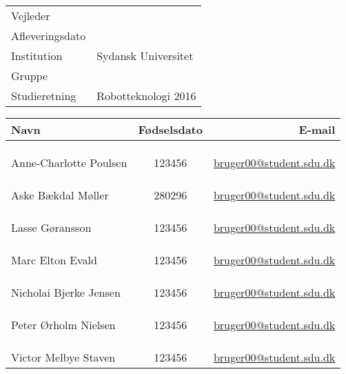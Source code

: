 \documentclass[../main.tex]{subfiles}
\begin{document}
\phantom{g}
\vspace{0.5cm}
\noindent
\begin{center}
\begin{Huge}
\textbf{\titel}
\end{Huge}
\\
\begin{huge}
\subtitel
\end{huge}
\\
\vspace{1cm}



\vspace{1.5cm}

\begin{tabular}{@{} l l @{}}
\hline
Vejleder         		&	\vejleder          	\\
Afleveringsdato 			& 	\dato				\\
Institution             	&   Sydansk Universitet	\\
Gruppe                  	&	\gruppe				\\
Studieretning           	& 	Robotteknologi 2016	\\
\hline
\end{tabular}
\thispagestyle{empty}

\vspace{1.5cm}


\newcommand{\fmedlem}[3]{%
\multicolumn{3}{c}{}\\
\multicolumn{3}{c}{}\\
\multicolumn{3}{c}{}\\
\hline
#1 & #2 & 	\href{mailto:#3@student.sdu.dk}{#3@student.sdu.dk}\\
}

\begin{tabular}{ l  c  r }

Navn						& Fødselsdato &	E-mail \\ 
\hline
\fmedlem{Anne-Charlotte Poulsen}{123456}{bruger00}
\fmedlem{Aske Bækdal Møller}{280296}{bruger00}
\fmedlem{Lasse Gøransson}{123456}{bruger00}
\fmedlem{Marc Elton Evald}{123456}{bruger00}
\fmedlem{Nicholai Bjerke Jensen}{123456}{bruger00}
\fmedlem{Peter Ørholm Nielsen}{123456}{bruger00}
\fmedlem{Victor Melbye Staven}{123456}{bruger00}
\end{tabular}
\end{center}
\end{document}
